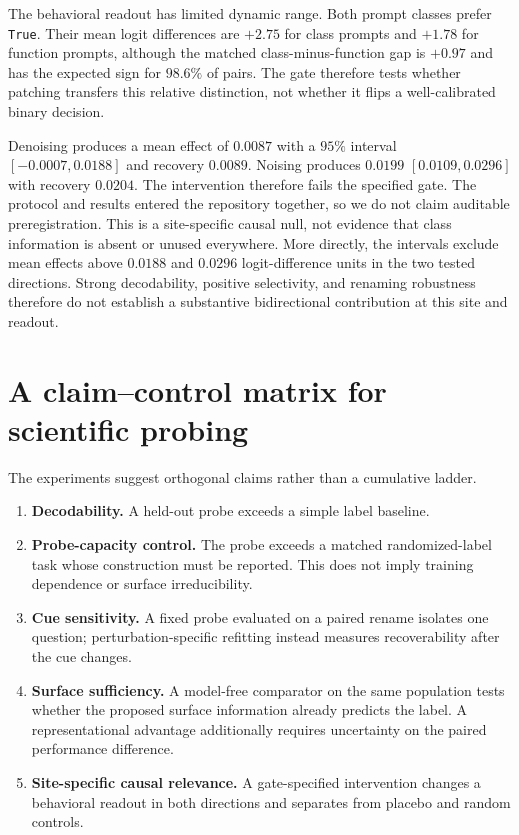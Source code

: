 \documentclass{article}
\begin{document}
The behavioral readout has limited dynamic range. Both prompt classes prefer
\texttt{True}. Their mean logit differences are $+2.75$ for class prompts and
$+1.78$ for function prompts, although the matched class-minus-function gap is
$+0.97$ and has the expected sign for $98.6\%$ of pairs. The gate therefore
tests whether patching transfers this relative distinction, not whether it
flips a well-calibrated binary decision.

Denoising produces a mean effect of $0.0087$ with a $95\%$ interval
$[-0.0007,0.0188]$ and recovery $0.0089$. Noising produces $0.0199$
$[0.0109,0.0296]$ with recovery $0.0204$. The intervention therefore fails the
specified gate. The protocol and results entered the repository together, so
we do not claim auditable preregistration. This is a site-specific causal null,
not evidence that class information is absent or unused everywhere. More
directly, the intervals exclude mean effects above $0.0188$ and $0.0296$
logit-difference units in the two tested directions. Strong decodability,
positive selectivity, and renaming robustness therefore do not establish a
substantive bidirectional contribution at this site and readout.

\section{A claim--control matrix for scientific probing}

The experiments suggest orthogonal claims rather than a cumulative ladder.

\begin{enumerate}\itemsep2pt
\item \textbf{Decodability.} A held-out probe exceeds a simple label baseline.
\item \textbf{Probe-capacity control.} The probe exceeds a matched
randomized-label task whose construction must be reported. This does not imply
training dependence or surface irreducibility.
\item \textbf{Cue sensitivity.} A fixed probe evaluated on a paired rename
isolates one question; perturbation-specific refitting instead measures
recoverability after the cue changes.
\item \textbf{Surface sufficiency.} A model-free comparator on the same
population tests whether the proposed surface information already predicts the
label. A representational advantage additionally requires uncertainty on the
paired performance difference.
\item \textbf{Site-specific causal relevance.} A gate-specified intervention
changes a behavioral readout in both directions and separates from placebo and
random controls.
\end{enumerate}
\end{document}
